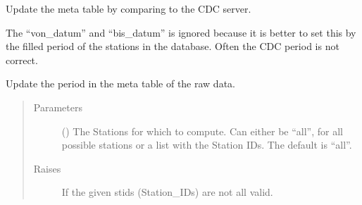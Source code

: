\documentclass[letterpaper,10pt,english]{sphinxmanual}
\begin{document}
\begin{fulllineitems}
\begin{fulllineitems}
\end{fulllineitems}


\begin{fulllineitems}
\label{\detokenize{weatherDB:weatherDB.stations.StationsBase.update_meta}}
\sphinxAtStartPar
Update the meta table by comparing to the CDC server.

\sphinxAtStartPar
The “von\_datum” and “bis\_datum” is ignored because it is better to set this by the filled period of the stations in the database.
Often the CDC period is not correct.

\end{fulllineitems}


\begin{fulllineitems}
\label{\detokenize{weatherDB:weatherDB.stations.StationsBase.update_period_meta}}
\sphinxAtStartPar
Update the period in the meta table of the raw data.
\begin{quote}\begin{description}
\item[{Parameters}] \leavevmode
\sphinxAtStartPar
{} (\sphinxstyleliteralemphasis{\sphinxupquote{, }}) \textendash{} The Stations for which to compute.
Can either be “all”, for all possible stations
or a list with the Station IDs.
The default is “all”.

\item[{Raises}] \leavevmode
\sphinxAtStartPar
{} \textendash{} If the given stids (Station\_IDs) are not all valid.

\end{description}\end{quote}


\end{fulllineitems}
\end{fulllineitems}
\end{document}
